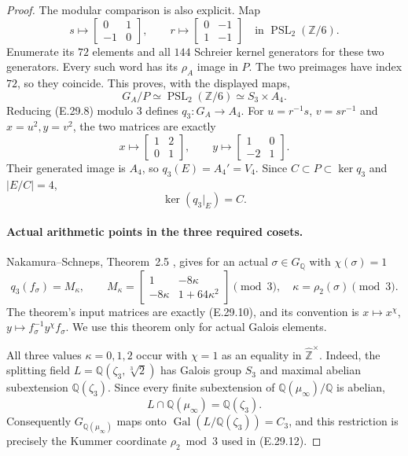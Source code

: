 \begin{proof}
The modular comparison is also explicit. Map
\[
 s\longmapsto\begin{bmatrix}0&1\\-1&0\end{bmatrix},
 \qquad
 r\longmapsto\begin{bmatrix}0&-1\\1&-1\end{bmatrix}
 \quad\text{in }\operatorname{PSL}_2(\mathbb Z/6).
 \tag{E.29.8}
\]
Enumerate its $72$ elements and all $144$ Schreier
kernel generators for these two generators. Every
such word has its $\rho_A$ image in $P$. The two
preimages have index $72$, so they coincide. This
proves, with the displayed maps,
\[
 G_A/P\simeq\operatorname{PSL}_2(\mathbb Z/6)
       \simeq S_3\times A_4.
 \tag{E.29.9}
\]
Reducing (E.29.8) modulo $3$ defines $q_3:G_A\to A_4$.
For $u=r^{-1}s$, $v=sr^{-1}$ and $x=u^2,y=v^2$,
the two matrices are exactly
\[
 x\longmapsto\begin{bmatrix}1&2\\0&1\end{bmatrix},
 \qquad y\longmapsto\begin{bmatrix}1&0\\-2&1\end{bmatrix}.
 \tag{E.29.10}
\]
Their generated image is $A_4$, so $q_3(E)=A_4'=V_4$.
Since $C\subset P\subset\ker q_3$ and $|E/C|=4$,
\[
 \ker(q_3|_E)=C.
 \tag{E.29.11}
\]

\paragraph{Actual arithmetic points in the three required cosets.}
Nakamura--Schneps, Theorem~2.5
\cite{BCNakamuraSchneps2000}, gives for an actual
$\sigma\in G_{\mathbb Q}$ with $\chi(\sigma)=1$
\[
 q_3(f_\sigma)=M_{\kappa},\qquad
 M_\kappa=
 \begin{bmatrix}
 1&-8\kappa\\-8\kappa&1+64\kappa^2
 \end{bmatrix}\pmod{3},
 \quad \kappa=\rho_2(\sigma)\pmod3.
 \tag{E.29.12}
\]
The theorem's input matrices are exactly (E.29.10),
and its convention is
$x\mapsto x^\chi$, $y\mapsto f_\sigma^{-1}y^\chi f_\sigma$.
We use this theorem only for actual Galois elements.

All three values $\kappa=0,1,2$ occur with $\chi=1$
as an equality in $\widehat{\mathbb Z}^{\times}$.
Indeed, the splitting field
$L=\mathbb Q(\zeta_3,\sqrt[3]{2})$ has Galois group
$S_3$ and maximal abelian subextension $\mathbb Q(\zeta_3)$.
Since every finite subextension of
$\mathbb Q(\mu_\infty)/\mathbb Q$ is abelian,
\[
 L\cap\mathbb Q(\mu_\infty)=\mathbb Q(\zeta_3).
\]
Consequently $G_{\mathbb Q(\mu_\infty)}$ maps onto
$\operatorname{Gal}(L/\mathbb Q(\zeta_3))=C_3$,
and this restriction is precisely the Kummer coordinate
$\rho_2\bmod3$ used in (E.29.12).


\end{proof}
